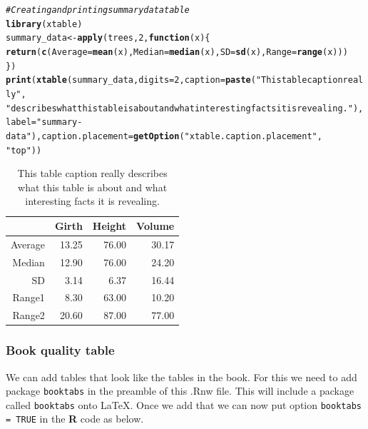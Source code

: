 \documentclass{article}\usepackage[]{graphicx}\usepackage[]{color}
\makeatletter
\newcommand{\hlnum}[1]{\textcolor[rgb]{0.686,0.059,0.569}{#1}}%
\newcommand{\hlstr}[1]{\textcolor[rgb]{0.192,0.494,0.8}{#1}}%
\newcommand{\hlcom}[1]{\textcolor[rgb]{0.678,0.584,0.686}{\textit{#1}}}%
\newcommand{\hlstd}[1]{\textcolor[rgb]{0.345,0.345,0.345}{#1}}%
\newcommand{\hlkwa}[1]{\textcolor[rgb]{0.161,0.373,0.58}{\textbf{#1}}}%
\newcommand{\hlkwb}[1]{\textcolor[rgb]{0.69,0.353,0.396}{#1}}%
\newcommand{\hlkwc}[1]{\textcolor[rgb]{0.333,0.667,0.333}{#1}}%
\newcommand{\hlkwd}[1]{\textcolor[rgb]{0.737,0.353,0.396}{\textbf{#1}}}%
\newenvironment{kframe}{%
 \def\at@end@of@kframe{}%
 \ifinner\ifhmode%
  \def\at@end@of@kframe{\end{minipage}}%
  \begin{minipage}{\columnwidth}%
 \fi\fi%
 \def\FrameCommand##1{\hskip\@totalleftmargin \hskip-\fboxsep
 \colorbox{shadecolor}{##1}\hskip-\fboxsep
     \hskip-\linewidth \hskip-\@totalleftmargin \hskip\columnwidth}%
 \MakeFramed {\advance\hsize-\width
   \@totalleftmargin\z@ \linewidth\hsize
   \@setminipage}}%
 {\par\unskip\endMakeFramed%
 \at@end@of@kframe}
\makeatother
\begin{document}
\begin{kframe}
\begin{alltt}
\hlcom{# Creating and printing summary data table}
\hlkwd{library}\hlstd{(xtable)}
\hlstd{summary_data} \hlkwb{<-} \hlkwd{apply}\hlstd{(trees,} \hlnum{2}\hlstd{,} \hlkwa{function}\hlstd{(}\hlkwc{x}\hlstd{) \{}
    \hlkwd{return}\hlstd{(}\hlkwd{c}\hlstd{(}\hlkwc{Average} \hlstd{=} \hlkwd{mean}\hlstd{(x),} \hlkwc{Median} \hlstd{=} \hlkwd{median}\hlstd{(x),} \hlkwc{SD} \hlstd{=} \hlkwd{sd}\hlstd{(x),} \hlkwc{Range} \hlstd{=} \hlkwd{range}\hlstd{(x)))}
\hlstd{\})}
\hlkwd{print}\hlstd{(}\hlkwd{xtable}\hlstd{(summary_data,} \hlkwc{digits} \hlstd{=} \hlnum{2}\hlstd{,} \hlkwc{caption} \hlstd{=} \hlkwd{paste}\hlstd{(}\hlstr{"This table caption really"}\hlstd{,}
    \hlstr{"describes what this table is about and what interesting facts it is revealing."}\hlstd{),}
    \hlkwc{label} \hlstd{=} \hlstr{"summary-data"}\hlstd{),} \hlkwc{caption.placement} \hlstd{=} \hlkwd{getOption}\hlstd{(}\hlstr{"xtable.caption.placement"}\hlstd{,}
    \hlstr{"top"}\hlstd{))}
\end{alltt}
\end{kframe}%
\begin{table}[ht]
\centering
\caption{This table caption really describes what this table is about and what interesting facts it is revealing.} 
\label{summary-data}
\begin{tabular}{rrrr}
  \hline
 & Girth & Height & Volume \\ 
  \hline
Average & 13.25 & 76.00 & 30.17 \\ 
  Median & 12.90 & 76.00 & 24.20 \\ 
  SD & 3.14 & 6.37 & 16.44 \\ 
  Range1 & 8.30 & 63.00 & 10.20 \\ 
  Range2 & 20.60 & 87.00 & 77.00 \\ 
   \hline
\end{tabular}
\end{table}


\subsubsection{Book quality table} We can add tables that look like the tables in the book. For this we need to add package \texttt{booktabs} in the preamble of this .Rnw file. This will include a package called \texttt{booktabs} onto \LaTeX. Once we add that we can now put option \texttt{booktabs = TRUE} in the \textbf{R} code as below.
\end{document}
